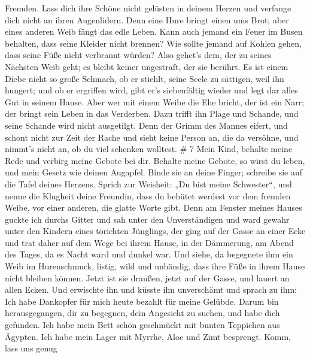 Fremden.  Lass dich ihre Schöne nicht gelüsten in deinem
Herzen und verfange dich nicht an ihren Augenlidern.  Denn
eine Hure bringt einen ums Brot; aber eines anderen Weib fängt das edle
Leben.  Kann auch jemand ein Feuer im Busen behalten, dass
seine Kleider nicht brennen?  Wie sollte jemand auf Kohlen
gehen, dass seine Füße nicht verbrannt würden?  Also
gehet's dem, der zu seines Nächsten Weib geht; es bleibt keiner
ungestraft, der sie berührt.  Es ist einem Diebe nicht so
große Schmach, ob er stiehlt, seine Seele zu sättigen, weil ihn hungert;
 und ob er ergriffen wird, gibt er's siebenfältig wieder
und legt dar alles Gut in seinem Hause.  Aber wer mit einem
Weibe die Ehe bricht, der ist ein Narr; der bringt sein Leben in das
Verderben.  Dazu trifft ihn Plage und Schande, und seine
Schande wird nicht ausgetilgt.  Denn der Grimm des Mannes
eifert, und schont nicht zur Zeit der Rache  und sieht
keine Person an, die da versöhne, und nimmt's nicht an, ob du viel
schenken wolltest. \# 7  Mein Kind, behalte meine Rede und
verbirg meine Gebote bei dir.  Behalte meine Gebote, so
wirst du leben, und mein Gesetz wie deinen Augapfel.  Binde
sie an deine Finger; schreibe sie auf die Tafel deines Herzens.
 Sprich zur Weisheit: „Du bist meine Schwester``, und nenne
die Klugheit deine Freundin,  dass du behütet werdest vor
dem fremden Weibe, vor einer anderen, die glatte Worte gibt.
 Denn am Fenster meines Hauses guckte ich durchs Gitter
 und sah unter den Unverständigen und ward gewahr unter den
Kindern eines törichten Jünglings,  der ging auf der Gasse
an einer Ecke und trat daher auf dem Wege bei ihrem Hause, 
in der Dämmerung, am Abend des Tages, da es Nacht ward und dunkel war.
 Und siehe, da begegnete ihm ein Weib im Hurenschmuck,
listig,  wild und unbändig, dass ihre Füße in ihrem Hause
nicht bleiben können.  Jetzt ist sie draußen, jetzt auf der
Gasse, und lauert an allen Ecken.  Und erwischte ihn und
küsste ihn unverschämt und sprach zu ihm:  Ich habe
Dankopfer für mich heute bezahlt für meine Gelübde.  Darum
bin herausgegangen, dir zu begegnen, dein Angesicht zu suchen, und habe
dich gefunden.  Ich habe mein Bett schön geschmückt mit
bunten Teppichen aus Ägypten.  Ich habe mein Lager mit
Myrrhe, Aloe und Zimt besprengt.  Komm, lass uns genug
